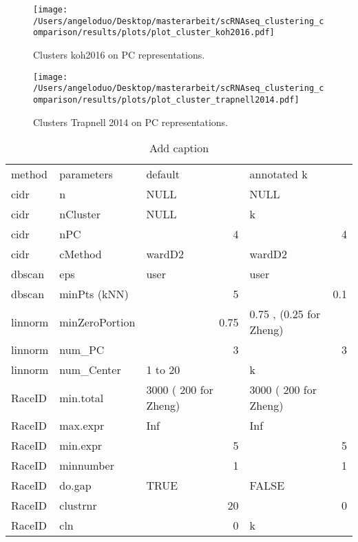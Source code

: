 \documentclass[12pt, a4paper]{article}\usepackage[]{graphicx}\usepackage[]{color}
\begin{document}
\begin{figure}[!h]
\texttt{[image: /Users/angeloduo/Desktop/masterarbeit/scRNAseq\_clustering\_comparison/results/plots/plot\_cluster\_koh2016.pdf]}
\caption{Clusters koh2016 on PC representations. }
\label{fig:clusterkoh}
\end{figure}



\begin{figure}[!h]
\texttt{[image: /Users/angeloduo/Desktop/masterarbeit/scRNAseq\_clustering\_comparison/results/plots/plot\_cluster\_trapnell2014.pdf]}
\caption{ Clusters Trapnell 2014 on PC representations. }
\label{fig:clustertrapnell}
\end{figure}
\begin{table}[htbp]
\centering
\caption{Add caption}
\begin{tabular}{llrr}
method & parameters & \multicolumn{1}{l}{default} & \multicolumn{1}{l}{annotated k} \\
cidr  & n     & \multicolumn{1}{l}{NULL} & \multicolumn{1}{l}{NULL} \\
cidr  & nCluster & \multicolumn{1}{l}{NULL} & \multicolumn{1}{l}{k} \\
cidr  & nPC   & 4     & 4 \\
cidr  & cMethod & \multicolumn{1}{l}{wardD2} & \multicolumn{1}{l}{wardD2} \\
dbscan & eps   & \multicolumn{1}{l}{user} & \multicolumn{1}{l}{user} \\
dbscan & minPts (kNN) & 5     & 0.1 \\
linnorm & minZeroPortion & 0.75  & \multicolumn{1}{l}{0.75 , (0.25 for Zheng)} \\
linnorm & num\_PC & 3     & 3 \\
linnorm & num\_Center & \multicolumn{1}{l}{1 to 20} & \multicolumn{1}{l}{k} \\
RaceID & min.total & \multicolumn{1}{l}{3000 ( 200 for Zheng)} & \multicolumn{1}{l}{3000 ( 200 for Zheng)} \\
RaceID & max.expr & \multicolumn{1}{l}{Inf} & \multicolumn{1}{l}{Inf} \\
RaceID & min.expr & 5     & 5 \\
RaceID & minnumber & 1     & 1 \\
RaceID & do.gap & \multicolumn{1}{l}{TRUE} & \multicolumn{1}{l}{FALSE} \\
RaceID & clustrnr & 20    & 0 \\
RaceID & cln   & 0     & \multicolumn{1}{l}{k} \\

\end{tabular}
\end{table}
\end{document}
